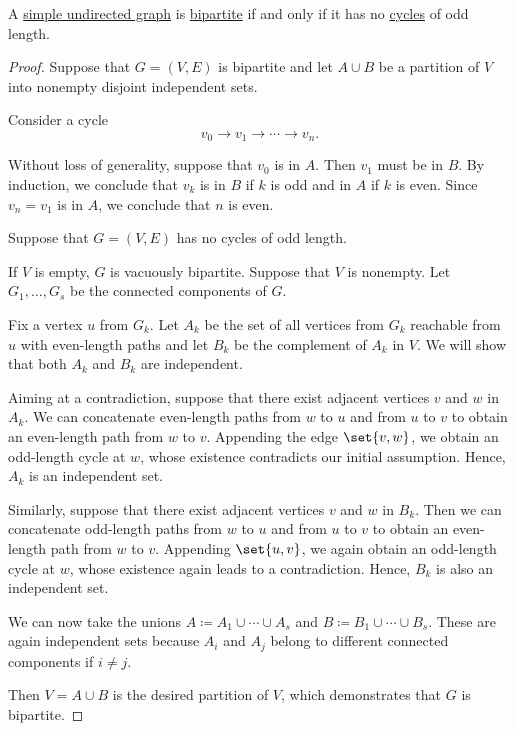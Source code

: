 \begin{proposition}\label{thm:bipartite_iff_no_odd_cycles}
  A \hyperref[def:undirected_graph]{simple undirected graph} is \hyperref[def:multipartite_graph]{bipartite} if and only if it has no \hyperref[def:graph_cycle]{cycles} of odd length.
\end{proposition}
\begin{proof}
  \SufficiencySubProof Suppose that \( G = (V, E) \) is bipartite and let \( A \cup B \) be a partition of \( V \) into nonempty disjoint independent sets.

  Consider a cycle
  \begin{equation*}
    v_0 \to v_1 \to \cdots \to v_n.
  \end{equation*}

  Without loss of generality, suppose that \( v_0 \) is in \( A \). Then \( v_1 \) must be in \( B \). By induction, we conclude that \( v_k \) is in \( B \) if \( k \) is odd and in \( A \) if \( k \) is even. Since \( v_n = v_1 \) is in \( A \), we conclude that \( n \) is even.

  \NecessitySubProof Suppose that \( G = (V, E) \) has no cycles of odd length.

  If \( V \) is empty, \( G \) is vacuously bipartite. Suppose that \( V \) is nonempty. Let \( G_1, \ldots, G_s \) be the connected components of \( G \).

  Fix a vertex \( u \) from \( G_k \). Let \( A_k \) be the set of all vertices from \( G_k \) reachable from \( u \) with even-length paths and let \( B_k \) be the complement of \( A_k \) in \( V \). We will show that both \( A_k \) and \( B_k \) are independent.

  Aiming at a contradiction, suppose that there exist adjacent vertices \( v \) and \( w \) in \( A_k \). We can concatenate even-length paths from \( w \) to \( u \) and from \( u \) to \( v \) to obtain an even-length path from \( w \) to \( v \). Appending the edge \( \set{ v, w } \), we obtain an odd-length cycle at \( w \), whose existence contradicts our initial assumption. Hence, \( A_k \) is an independent set.

  Similarly, suppose that there exist adjacent vertices \( v \) and \( w \) in \( B_k \). Then we can concatenate odd-length paths from \( w \) to \( u \) and from \( u \) to \( v \) to obtain an even-length path from \( w \) to \( v \). Appending \( \set{ u, v } \), we again obtain an odd-length cycle at \( w \), whose existence again leads to a contradiction. Hence, \( B_k \) is also an independent set.

  We can now take the unions \( A \coloneqq A_1 \cup \cdots \cup A_s \) and \( B \coloneqq B_1 \cup \cdots \cup B_s \). These are again independent sets because \( A_i \) and \( A_j \) belong to different connected components if \( i \neq j \).

  Then \( V = A \cup B \) is the desired partition of \( V \), which demonstrates that \( G \) is bipartite.
\end{proof}

